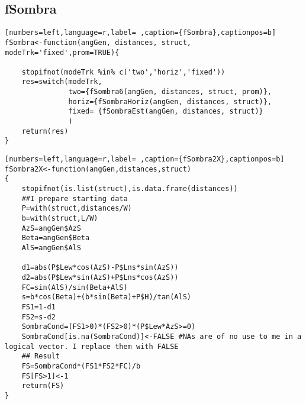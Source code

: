 \subsection{fSombra}
\label{sec:org8bb8a78}
\begin{lstlisting}[numbers=left,language=r,label= ,caption={fSombra},captionpos=b]
fSombra<-function(angGen, distances, struct, modeTrk='fixed',prom=TRUE){

    stopifnot(modeTrk %in% c('two','horiz','fixed'))
    res=switch(modeTrk, 
               two={fSombra6(angGen, distances, struct, prom)},
               horiz={fSombraHoriz(angGen, distances, struct)},
               fixed= {fSombraEst(angGen, distances, struct)}
               )
    return(res)
}
\end{lstlisting}
\begin{lstlisting}[numbers=left,language=r,label= ,caption={fSombra2X},captionpos=b]
fSombra2X<-function(angGen,distances,struct)
{
    stopifnot(is.list(struct),is.data.frame(distances))
    ##I prepare starting data	
    P=with(struct,distances/W)
    b=with(struct,L/W)
    AzS=angGen$AzS
    Beta=angGen$Beta
    AlS=angGen$AlS

    d1=abs(P$Lew*cos(AzS)-P$Lns*sin(AzS))
    d2=abs(P$Lew*sin(AzS)+P$Lns*cos(AzS))
    FC=sin(AlS)/sin(Beta+AlS)
    s=b*cos(Beta)+(b*sin(Beta)+P$H)/tan(AlS)
    FS1=1-d1
    FS2=s-d2
    SombraCond=(FS1>0)*(FS2>0)*(P$Lew*AzS>=0)
    SombraCond[is.na(SombraCond)]<-FALSE #NAs are of no use to me in a logical vector. I replace them with FALSE
    ## Result
    FS=SombraCond*(FS1*FS2*FC)/b
    FS[FS>1]<-1
    return(FS)
}	
\end{lstlisting}
